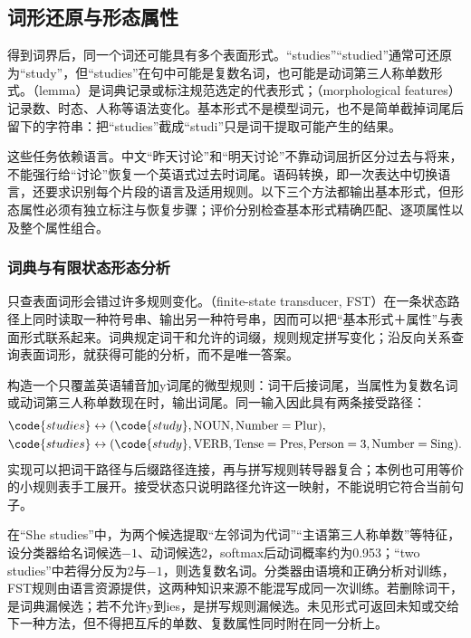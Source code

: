 \subsection{词形还原与形态属性}
\label{sec:nlp-analysis-morphology}

得到词界后，同一个词还可能具有多个表面形式。“studies”“studied”通常可还原为“study”，但“studies”在句中可能是复数名词，也可能是动词第三人称单数形式。（lemma）是词典记录或标注规范选定的代表形式；（morphological features）记录数、时态、人称等语法变化。基本形式不是模型词元，也不是简单截掉词尾后留下的字符串：把“studies”截成“studi”只是词干提取可能产生的结果。

这些任务依赖语言。中文“昨天讨论”和“明天讨论”不靠动词屈折区分过去与将来，不能强行给“讨论”恢复一个英语式过去时词尾。语码转换，即一次表达中切换语言，还要求识别每个片段的语言及适用规则。以下三个方法都输出基本形式，但形态属性必须有独立标注与恢复步骤；评价分别检查基本形式精确匹配、逐项属性以及整个属性组合。

\subsubsection{词典与有限状态形态分析}
\label{sec:nlp-analysis-fst}

只查表面词形会错过许多规则变化。（finite-state transducer, FST）在一条状态路径上同时读取一种符号串、输出另一种符号串，因而可以把“基本形式＋属性”与表面形式联系起来。词典规定词干和允许的词缀，规则规定拼写变化；沿反向关系查询表面词形，就获得可能的分析，而不是唯一答案。

构造一个只覆盖英语辅音加y词尾的微型规则：词干后接词尾，当属性为复数名词或动词第三人称单数现在时，输出词尾。同一输入因此具有两条接受路径：
\[
\begin{aligned}
 \code{studies}&\leftrightarrow
   (\code{study},\mathrm{NOUN},\mathrm{Number=Plur}),\\
 \code{studies}&\leftrightarrow
   (\code{study},\mathrm{VERB},\mathrm{Tense=Pres},
                       \mathrm{Person=3},\mathrm{Number=Sing}).
\end{aligned}
\]
实现可以把词干路径与后缀路径连接，再与拼写规则转导器复合；本例也可用等价的小规则表手工展开。接受状态只说明路径允许这一映射，不能说明它符合当前句子。

在“She studies”中，为两个候选提取“左邻词为代词”“主语第三人称单数”等特征，设分类器给名词候选$-1$、动词候选2，softmax后动词概率约为0.953；“two studies”中若得分反为2与$-1$，则选复数名词。分类器由语境和正确分析对训练，FST规则由语言资源提供，这两种知识来源不能混写成同一次训练。若删除词干，是词典漏候选；若不允许y到ies，是拼写规则漏候选。未见形式可返回未知或交给下一种方法，但不得把互斥的单数、复数属性同时附在同一分析上。

